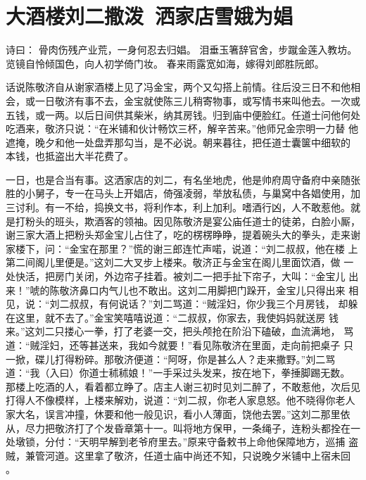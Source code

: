\chapter{大酒楼刘二撒泼~洒家店雪娥为娼}

诗曰：
骨肉伤残产业荒，一身何忍去归娼。
泪垂玉箸辞官舍，步蹴金莲入教坊。
览镜自怜倾国色，向人初学倚门妆。
春来雨露宽如海，嫁得刘郎胜阮郎。

话说陈敬济自从谢家酒楼上见了冯金宝，两个又勾搭上前情。往后没三日不和他相
会，或一日敬济有事不去，金宝就使陈三儿稍寄物事，或写情书来叫他去。一次或
五钱，或一两。以后日间供其柴米，纳其房钱。归到庙中便脸红。任道士问他何处
吃酒来，敬济只说：“在米铺和伙计畅饮三杯，解辛苦来。”他师兄金宗明一力替
他遮掩，晚夕和他一处盘弄那勾当，是不必说。朝来暮往，把任道士囊箧中细软的
本钱，也抵盗出大半花费了。

一日，也是合当有事。这洒家店的刘二，有名坐地虎，他是帅府周守备府中亲随张
胜的小舅子，专一在马头上开娼店，倚强凌弱，举放私债，与巢窝中各娼使用，加
三讨利。有一不给，捣换文书，将利作本，利上加利。嗜酒行凶，人不敢惹他。就
是打粉头的班头，欺酒客的领袖。因见陈敬济是宴公庙任道士的徒弟，白脸小厮，
谢三家大酒上把粉头郑金宝儿占住了，吃的楞楞睁睁，提着碗头大的拳头，走来谢
家楼下，问：“金宝在那里？”慌的谢三郎连忙声喏，说道：“刘二叔叔，他在楼
上第二间阁儿里便是。”这刘二大叉步上楼来。敬济正与金宝在阁儿里面饮酒，做
一处快活，把房门关闭，外边帘子挂着。被刘二一把手扯下帘子，大叫：“金宝儿
出来！”唬的陈敬济鼻口内气儿也不敢出。这刘二用脚把门跺开，金宝儿只得出来
相见，说：“刘二叔叔，有何说话？”刘二骂道：“贼淫妇，你少我三个月房钱，
却躲在这里，就不去了。”金宝笑嘻嘻说道：“二叔叔，你家去，我使妈妈就送房
钱来。”这刘二只搂心一拳，打了老婆一交，把头颅抢在阶沿下磕破，血流满地，
骂道：“贼淫妇，还等甚送来，我如今就要！”看见陈敬济在里面，走向前把桌子
只一掀，碟儿打得粉碎。那敬济便道：“阿呀，你是甚么人？走来撒野。”刘二骂
道：“我（入曰）你道士秫秫娘！”一手采过头发来，按在地下，拳捶脚踢无数。
那楼上吃酒的人，看着都立睁了。店主人谢三初时见刘二醉了，不敢惹他，次后见
打得人不像模样，上楼来解劝，说道：“刘二叔，你老人家息怒。他不晓得你老人
家大名，误言冲撞，休要和他一般见识，看小人薄面，饶他去罢。”这刘二那里依
从，尽力把敬济打了个发昏章第十一。叫将地方保甲，一条绳子，连粉头都拴在一
处墩锁，分付：“天明早解到老爷府里去。”原来守备敕书上命他保障地方，巡捕
盗贼，兼管河道。这里拿了敬济，任道士庙中尚还不知，只说晚夕米铺中上宿未回
。

